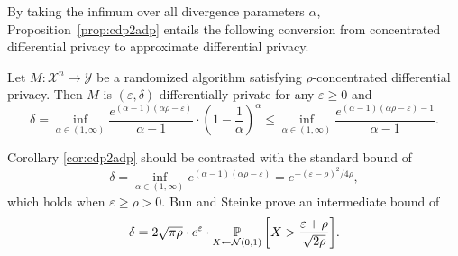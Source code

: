 \documentclass{jpcfinal} %
\newcommand{\pr}[2]{{\ifx&#1& \mathbb{P} \else
\underset{#1}{\mathbb{P}} \fi \left[#2\right]}}
\newcommand{\eps}{\varepsilon}
\begin{document}
By taking the infimum over all divergence parameters $\alpha$, Proposition~\ref{prop:cdp2adp} entails the following conversion from concentrated differential privacy to approximate differential privacy.

\begin{cor}\label{cor:cdp2adp}
Let $M\colon \mathcal{X}^n \to \mathcal{Y}$ be a randomized algorithm satisfying $\rho$-concentrated differential privacy. 
Then $M$ is $(\eps,\delta)$-differentially private for any $\eps\ge0$ and
\begin{equation}
    \delta= \inf_{\alpha \in (1,\infty)} \frac{e^{(\alpha-1)(\alpha\rho-\eps)}}{\alpha-1} \cdot \left(1-\frac{1}{\alpha}\right)^\alpha \le \inf_{\alpha \in (1,\infty)} \frac{e^{(\alpha-1)(\alpha\rho-\eps)-1}}{\alpha-1}.\label{eq:cdp2adp}
\end{equation}
\end{cor}
Corollary \ref{cor:cdp2adp} should be contrasted with the standard bound \citep{DworkRV10,DworkR16,BunS16,Mironov17} of
\begin{equation}
    \delta = \inf_{\alpha \in (1,\infty)} e^{(\alpha-1)(\alpha\rho-\eps)} = e^{-(\eps-\rho)^2/4\rho},
\end{equation}
which holds when $\eps\ge\rho>0$. Bun and Steinke \cite{BunS16} prove an intermediate bound of
\begin{equation}
    \delta = 2\sqrt{\pi\rho} \cdot e^\eps \cdot \pr{X \gets \mathcal{N}(0,1)}{X>\frac{\eps+\rho}{\sqrt{2\rho}}}.
\end{equation}
\end{document}
